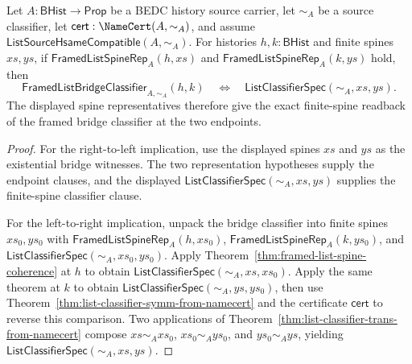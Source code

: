 
\begin{theorem}
\label{thm:framed-list-bridge-classifier-displayed-spine-exactness}
Let $A:\mathsf{BHist}\to\mathsf{Prop}$ be a BEDC history source carrier, let
$\sim_A$ be a source classifier, let $\mathsf{cert}:\NameCert(A,\sim_A)$, and
assume $\mathsf{ListSourceHsameCompatible}(A,\sim_A)$. For histories
$h,k:\mathsf{BHist}$ and finite spines $xs,ys$, if
$\mathsf{FramedListSpineRep}_A(h,xs)$ and
$\mathsf{FramedListSpineRep}_A(k,ys)$ hold, then
$$
\mathsf{FramedListBridgeClassifier}_{A,\sim_A}(h,k)
\quad\Longleftrightarrow\quad
\mathsf{ListClassifierSpec}(\sim_A,xs,ys).
$$
The displayed spine representatives therefore give the exact finite-spine
readback of the framed bridge classifier at the two endpoints.
\end{theorem}
\begin{proof}
For the right-to-left implication, use the displayed spines $xs$ and $ys$ as the
existential bridge witnesses. The two representation hypotheses supply the
endpoint clauses, and the displayed
$\mathsf{ListClassifierSpec}(\sim_A,xs,ys)$ supplies the finite-spine classifier
clause.

For the left-to-right implication, unpack the bridge classifier into finite
spines $xs_0,ys_0$ with $\mathsf{FramedListSpineRep}_A(h,xs_0)$,
$\mathsf{FramedListSpineRep}_A(k,ys_0)$, and
$\mathsf{ListClassifierSpec}(\sim_A,xs_0,ys_0)$. Apply
Theorem~\ref{thm:framed-list-spine-coherence} at $h$ to obtain
$\mathsf{ListClassifierSpec}(\sim_A,xs,xs_0)$. Apply the same theorem at $k$ to
obtain $\mathsf{ListClassifierSpec}(\sim_A,ys,ys_0)$, then use
Theorem~\ref{thm:list-classifier-symm-from-namecert} and the certificate
$\mathsf{cert}$ to reverse this comparison. Two applications of
Theorem~\ref{thm:list-classifier-trans-from-namecert} compose
$xs\sim_A xs_0$, $xs_0\sim_A ys_0$, and $ys_0\sim_A ys$, yielding
$\mathsf{ListClassifierSpec}(\sim_A,xs,ys)$.
\end{proof}

